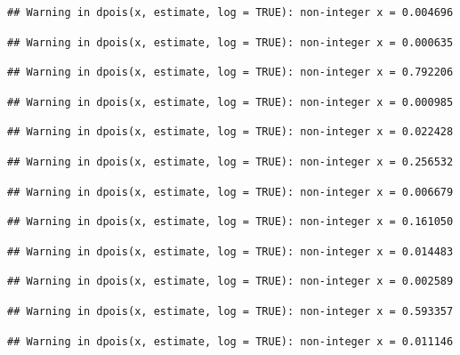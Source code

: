 \documentclass[]{article}
\begin{document}
\begin{verbatim}
## Warning in dpois(x, estimate, log = TRUE): non-integer x = 0.004696
\end{verbatim}

\begin{verbatim}
## Warning in dpois(x, estimate, log = TRUE): non-integer x = 0.000635
\end{verbatim}

\begin{verbatim}
## Warning in dpois(x, estimate, log = TRUE): non-integer x = 0.792206
\end{verbatim}

\begin{verbatim}
## Warning in dpois(x, estimate, log = TRUE): non-integer x = 0.000985
\end{verbatim}

\begin{verbatim}
## Warning in dpois(x, estimate, log = TRUE): non-integer x = 0.022428
\end{verbatim}

\begin{verbatim}
## Warning in dpois(x, estimate, log = TRUE): non-integer x = 0.256532
\end{verbatim}

\begin{verbatim}
## Warning in dpois(x, estimate, log = TRUE): non-integer x = 0.006679
\end{verbatim}

\begin{verbatim}
## Warning in dpois(x, estimate, log = TRUE): non-integer x = 0.161050
\end{verbatim}

\begin{verbatim}
## Warning in dpois(x, estimate, log = TRUE): non-integer x = 0.014483
\end{verbatim}

\begin{verbatim}
## Warning in dpois(x, estimate, log = TRUE): non-integer x = 0.002589
\end{verbatim}

\begin{verbatim}
## Warning in dpois(x, estimate, log = TRUE): non-integer x = 0.593357
\end{verbatim}

\begin{verbatim}
## Warning in dpois(x, estimate, log = TRUE): non-integer x = 0.011146
\end{verbatim}
\end{document}
